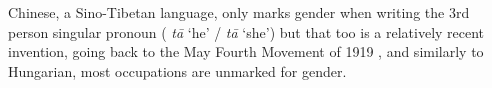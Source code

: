 \documentclass[11pt]{article}
\newcommand{\zh}[1]{\simplifiedchinesefont{#1}\rmfamily}
\begin{document}
Chinese, a Sino-Tibetan language, only marks gender when writing the 3rd person singular pronoun (\zh{他} \textit{tā} `he' / \zh{她} \textit{tā} `she') but that too is a relatively recent invention, going back to the May Fourth Movement of 1919 \citep{bi_2013_tazi}, and similarly to Hungarian, most occupations are unmarked for gender.


\end{document}
